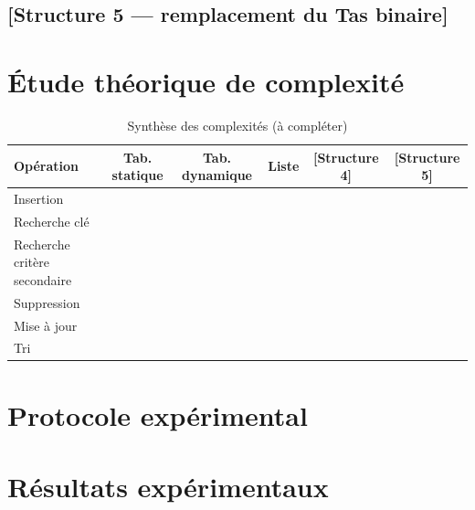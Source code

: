 \documentclass[12pt,a4paper]{report}
\begin{document}
\section{[Structure 5 — remplacement du Tas binaire]}

\chapter{Étude théorique de complexité}

\begin{table}[h]
\centering
\caption{Synthèse des complexités (à compléter)}
\begin{tabular}{lccccc}
\toprule
Opération & Tab. statique & Tab. dynamique & Liste & [Structure 4] & [Structure 5] \\
\midrule
Insertion       & & & & & \\
Recherche clé    & & & & & \\
Recherche critère secondaire & & & & & \\
Suppression      & & & & & \\
Mise à jour      & & & & & \\
Tri              & & & & & \\
\bottomrule
\end{tabular}
\end{table}

\chapter{Protocole expérimental}

\chapter{Résultats expérimentaux}
\end{document}
